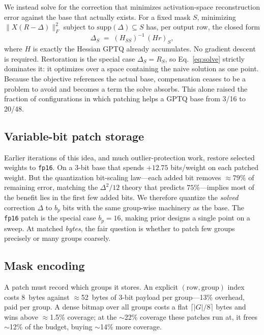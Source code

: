 \documentclass[11pt]{article}
\newcommand{\bpw}{bits/weight}
\newcommand{\code}[1]{\texttt{#1}}
\begin{document}
We instead solve for the correction that minimizes activation-space
reconstruction error against the base that actually exists. For a fixed mask
$S$, minimizing $\lVert X(R - \Delta)\rVert_F^2$ subject to
$\mathrm{supp}(\Delta)\subseteq S$ has, per output row, the closed form
\begin{equation}
  \Delta_S \;=\; (H_{SS})^{-1}\,(Hr)_S ,
  \label{eq:solve}
\end{equation}
where $H$ is exactly the Hessian GPTQ already accumulates. No gradient descent
is required. Restoration is the special case $\Delta_S = R_S$, so
Eq.~\eqref{eq:solve} strictly dominates it: it optimizes over a space
containing the naive solution as one point. Because the objective references
the actual base, compensation ceases to be a problem to avoid and becomes a
term the solve absorbs. This alone raised the fraction of configurations in
which patching helps a GPTQ base from 3/16 to 20/48.

\subsection{Variable-bit patch storage}
\label{sec:varbit}
Earlier iterations of this idea, and much outlier-protection work, restore
selected weights to \code{fp16}. On a 3-bit base that spends $+12.75$
\bpw{} on each patched weight. But the quantization bit-scaling law---each
added bit removes $\approx 79\%$ of remaining error, matching the
$\Delta^2/12$ theory that predicts $75\%$---implies most of the benefit lies in
the first few added bits. We therefore quantize the \emph{solved} correction
$\Delta$ to $b_p$ bits with the same group-wise machinery as the base. The
\code{fp16} patch is the special case $b_p{=}16$, making prior designs a
single point on a sweep. At matched \emph{bytes}, the fair question is whether
to patch few groups precisely or many groups coarsely.

\subsection{Mask encoding}
A patch must record which groups it stores. An explicit $(\text{row},
\text{group})$ index costs 8~bytes against $\approx$52~bytes of 3-bit payload
per group---13\% overhead, paid per group. A dense bitmap over all groups costs
a flat $\lceil |G|/8\rceil$ bytes and wins above $\approx$1.5\% coverage; at the
$\sim$22\% coverage these patches run at, it frees $\sim$12\% of the budget,
buying $\sim$14\% more coverage.
\end{document}

